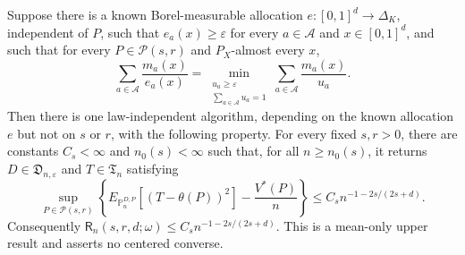 Suppose there is a known Borel-measurable allocation \(e:[0,1]^d\to\Delta_K\), independent of \(P\), such that \(e_a(x)\geq\varepsilon\) for every \(a\in\mathcal A\) and \(x\in[0,1]^d\), and such that for every \(P\in\mathcal P(s,r)\) and \(P_X\)-almost every \(x\),
\[
\sum_{a\in\mathcal A}\frac{m_a(x)}{e_a(x)}
=\min_{\substack{u_a\geq\varepsilon\\ \sum_{a\in\mathcal A}u_a=1}}
\sum_{a\in\mathcal A}\frac{m_a(x)}{u_a}.
\tag{43}
\]
Then there is one law-independent algorithm, depending on the known allocation \(e\) but not on \(s\) or \(r\), with the following property. For every fixed \(s,r>0\), there are constants \(C_{s}<\infty\) and \(n_0(s)<\infty\) such that, for all \(n\geq n_0(s)\), it returns \(D\in\mathfrak D_{n,\varepsilon}\) and \(T\in\mathfrak T_n\) satisfying
\[
\sup_{P\in\mathcal P(s,r)}
\left\{
E_{\mathbb P_n^{D,P}}[(T-\theta(P))^2]-\frac{V^*(P)}n
\right\}
\leq C_s n^{-1-2s/(2s+d)}.
\tag{44}
\]
Consequently \(\mathsf R_n(s,r,d;\omega)\leq C_s n^{-1-2s/(2s+d)}\). This is a mean-only upper result and asserts no centered converse.